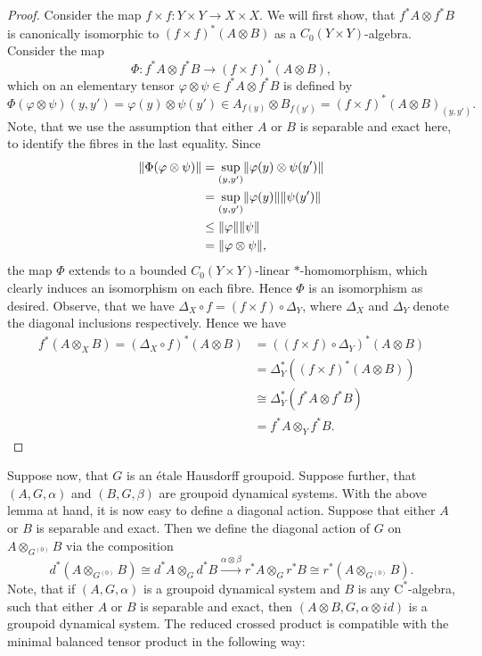 	\begin{proof}
		Consider the map $f\times f:Y\times Y\rightarrow X\times X$. We will first show, that $f^*A\otimes f^*B$ is canonically isomorphic to $(f\times f)^*(A\otimes B)$ as a $C_0(Y\times Y)$-algebra. Consider the map
		$$\Phi:f^*A\otimes f^*B\rightarrow (f\times f)^*(A\otimes B),$$ 
		which on an elementary tensor $\varphi\otimes \psi\in f^*A\otimes f^*B$ is defined by
		$$\Phi(\varphi\otimes \psi)(y,y')=\varphi(y)\otimes\psi(y')
		\in A_{f(y)}\otimes B_{f(y')}=(f\times f)^*(A\otimes B)_{(y,y')}.$$
		Note, that we use the assumption that either $A$ or $B$ is separable and exact here, to identify the fibres in the last equality. Since
		\begin{align*}\lVert\Phi(\varphi\otimes\psi)\rVert&=\sup\limits_{(y,y')} \lVert\varphi(y)\otimes\psi(y')\rVert\\
		&=\sup\limits_{(y,y')}\lVert\varphi(y)\rVert\lVert\psi(y')\rVert\\
		&\leq\lVert\varphi\rVert\lVert\psi\rVert\\
		&=\lVert\varphi\otimes\psi\rVert,
		\end{align*}
		the map $\Phi$ extends to a bounded $C_0(Y\times Y)$-linear $\ast$-homomorphism, which clearly induces an isomorphism on each fibre. Hence $\Phi$ is an isomorphism as desired.
		Observe, that we have $\Delta_X\circ f=(f\times f)\circ \Delta_Y$, where $\Delta_X$ and $\Delta_Y$ denote the diagonal inclusions respectively. Hence we have
		\begin{align*}
		f^*(A\otimes_X B)=(\Delta_X\circ f)^*(A\otimes B)&=((f\times f)\circ \Delta_Y)^*(A\otimes B)\\
		&=\Delta_Y^*((f\times f)^*(A\otimes B))\\
		& \cong\Delta_Y^*(f^*A\otimes f^*B)\\
		&=f^*A\otimes_Y f^*B.
		\end{align*}
	\end{proof}
	Suppose now, that $G$ is an étale Hausdorff groupoid. Suppose further, that $(A,G,\alpha)$ and $(B,G,\beta)$ are groupoid dynamical systems. With the above lemma at hand, it is now easy to define a diagonal action. Suppose that either $A$ or $B$ is separable and exact. Then we define the diagonal action of $G$ on $A\otimes_{G^{(0)}} B$ via the composition
	$$d^*(A\otimes_{G^{(0)}} B)\cong d^*A\otimes_G d^*B\stackrel{\alpha\otimes \beta}{\longrightarrow}r^*A\otimes_G r^*B\cong r^*(A\otimes_{G^{(0)}} B).$$
	Note, that if $(A,G,\alpha)$ is a groupoid dynamical system and $B$ is any $\mathrm{C}^*$-algebra, such that either $A$ or $B$ is separable and exact, then $(A\otimes B,G,\alpha\otimes id)$ is a groupoid dynamical system. The reduced crossed product is compatible with the minimal balanced tensor product in the following way:

